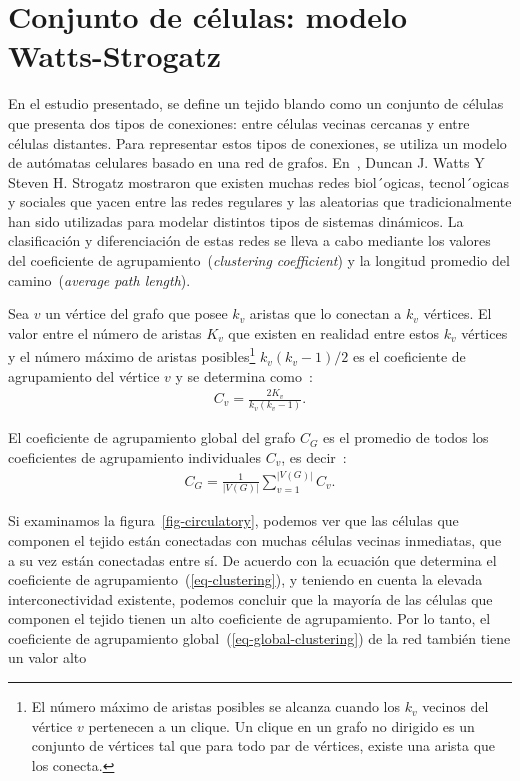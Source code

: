\section{Conjunto de c\'elulas: modelo Watts-Strogatz}

En el estudio presentado, se define un tejido blando como un conjunto de células que presenta dos tipos de conexiones: entre células vecinas cercanas y entre células distantes. Para representar estos tipos de conexiones, se utiliza un modelo de autómatas celulares basado en una red de grafos. En~\cite{9}, Duncan J. Watts Y Steven H. Strogatz mostraron que existen muchas redes biol´ogicas, tecnol´ogicas y sociales que yacen entre las redes regulares y las aleatorias que tradicionalmente han sido utilizadas para modelar distintos tipos de sistemas din\'amicos. La clasificaci\'on y diferenciaci\'on de estas redes se lleva a cabo mediante los valores del coeficiente de agrupamiento~(\emph{clustering coefficient}) y la longitud promedio del camino~(\emph{average path length}). 

\begin{definition} 
\label{def-clustering}
Sea $v$ un v\'ertice del grafo que posee $k_v$ aristas que lo conectan a $k_v$ v\'ertices. El valor entre el n\'umero de aristas $K_v$ que existen en realidad entre estos $k_v$ v\'ertices y el n\'umero m\'aximo de aristas posibles\footnote{El n\'umero m\'aximo de aristas posibles se alcanza cuando los $k_v$ vecinos del v\'ertice $v$ pertenecen a un clique. Un clique en un grafo no dirigido es un conjunto de v\'ertices tal que para todo par de v\'ertices, existe una arista que los conecta.} $k_v(k_v-1)/2$ es el coeficiente de agrupamiento del v\'ertice $v$ y se determina como~\cite{7}:
\begin{align}
C_v = \displaystyle\frac{2K_v}{k_v(k_v-1)}. \label{eq-clustering}
\end{align}
\end{definition}

\begin{definition}
\label{def-global-clustering}
El coeficiente de agrupamiento global del grafo $C_G$ es el promedio de todos los coeficientes de agrupamiento individuales $C_v$, es decir~\cite{7}:
\begin{align}
C_G = \displaystyle\frac{1}{|V(G)|}\sum _{v=1} ^{|V(G)|} C_v. \label{eq-global-clustering}
\end{align}
\end{definition}

Si examinamos la figura~\ref{fig-circulatory}, podemos ver que las células que componen el tejido están conectadas con muchas células vecinas inmediatas, que a su vez están conectadas entre sí. De acuerdo con la ecuación que determina el coeficiente de agrupamiento~(\ref{eq-clustering}), y teniendo en cuenta la elevada interconectividad existente, podemos concluir que la mayoría de las células que componen el tejido tienen un alto coeficiente de agrupamiento. Por lo tanto, el coeficiente de agrupamiento global~(\ref{eq-global-clustering}) de la red también tiene un valor alto

